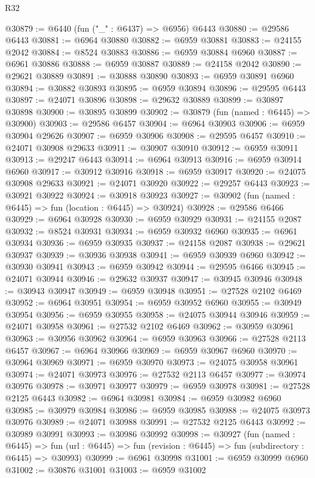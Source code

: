 \begin{lexlean}{R32}
\begin{coremodule}
@30879 := @6440 (fun ("_" : @6437) => @6956) @6443
@30880 := @29586 @6443
@30881 := @6964 @30880
@30882 := @6959 @30881
@30883 := @24155 @2042
@30884 := @8524 @30883
@30886 := @6959 @30884 @6960
@30887 := @6961 @30886
@30888 := @6959 @30887
@30889 := @24158 @2042
@30890 := @29621 @30889
@30891 := @30888 @30890
@30893 := @6959 @30891 @6960
@30894 := @30882 @30893
@30895 := @6959 @30894
@30896 := @29595 @6443
@30897 := @24071 @30896
@30898 := @29632 @30889
@30899 := @30897 @30898
@30900 := @30895 @30899
@30902 := @30879 (fun (named : @6445) => @30900)
@30903 := @29586 @6457
@30904 := @6964 @30903
@30906 := @6959 @30904 @29626
@30907 := @6959 @30906
@30908 := @29595 @6457
@30910 := @24071 @30908 @29633
@30911 := @30907 @30910
@30912 := @6959 @30911
@30913 := @29247 @6443
@30914 := @6964 @30913
@30916 := @6959 @30914 @6960
@30917 := @30912 @30916
@30918 := @6959 @30917
@30920 := @24075 @30908 @29633
@30921 := @24071 @30920
@30922 := @29257 @6443
@30923 := @30921 @30922
@30924 := @30918 @30923
@30927 := @30902 (fun (named : @6445) => fun (location : @6445) => @30924)
@30928 := @29586 @6466
@30929 := @6964 @30928
@30930 := @6959 @30929
@30931 := @24155 @2087
@30932 := @8524 @30931
@30934 := @6959 @30932 @6960
@30935 := @6961 @30934
@30936 := @6959 @30935
@30937 := @24158 @2087
@30938 := @29621 @30937
@30939 := @30936 @30938
@30941 := @6959 @30939 @6960
@30942 := @30930 @30941
@30943 := @6959 @30942
@30944 := @29595 @6466
@30945 := @24071 @30944
@30946 := @29632 @30937
@30947 := @30945 @30946
@30948 := @30943 @30947
@30949 := @6959 @30948
@30951 := @27528 @2102 @6469
@30952 := @6964 @30951
@30954 := @6959 @30952 @6960
@30955 := @30949 @30954
@30956 := @6959 @30955
@30958 := @24075 @30944 @30946
@30959 := @24071 @30958
@30961 := @27532 @2102 @6469
@30962 := @30959 @30961
@30963 := @30956 @30962
@30964 := @6959 @30963
@30966 := @27528 @2113 @6457
@30967 := @6964 @30966
@30969 := @6959 @30967 @6960
@30970 := @30964 @30969
@30971 := @6959 @30970
@30973 := @24075 @30958 @30961
@30974 := @24071 @30973
@30976 := @27532 @2113 @6457
@30977 := @30974 @30976
@30978 := @30971 @30977
@30979 := @6959 @30978
@30981 := @27528 @2125 @6443
@30982 := @6964 @30981
@30984 := @6959 @30982 @6960
@30985 := @30979 @30984
@30986 := @6959 @30985
@30988 := @24075 @30973 @30976
@30989 := @24071 @30988
@30991 := @27532 @2125 @6443
@30992 := @30989 @30991
@30993 := @30986 @30992
@30998 := @30927
    (fun (named : @6445) =>
    fun (url : @6445) => fun (revision : @6445) => fun (subdirectory : @6445) => @30993)
@30999 := @6961 @30998
@31001 := @6959 @30999 @6960
@31002 := @30876 @31001
@31003 := @6959 @31002

\end{coremodule}
\end{lexlean}
